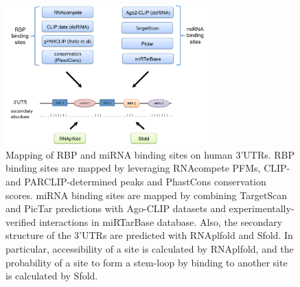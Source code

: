 \clearpage
\begin{figure}[H]
   \centering
   \includegraphics[width=0.7\textwidth]{ch3_materials_methods/figures/Figure1}

\caption[]{Mapping of RBP and miRNA binding sites on human 3'UTRs. RBP binding sites are mapped by leveraging RNAcompete PFMs, CLIP- and PARCLIP-determined peaks and PhastCons conservation scores. miRNA binding sites are mapped by combining TargetScan and PicTar predictions with Ago-CLIP datasets and experimentally-verified interactions in miRTarBase database. Also, the secondary structure of the 3'UTRs are predicted with RNAplfold and Sfold. In particular, accessibility of a site is calculated by RNAplfold, and the probability of a site to form a stem-loop by binding to another site is calculated by Sfold.}
\label{overview}
\end{figure}


